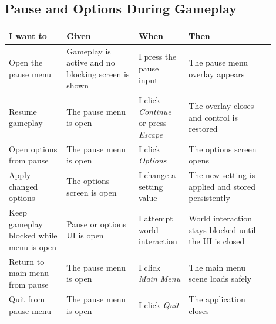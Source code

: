 \subsection*{Pause and Options During Gameplay}
\begin{table}[H]
\centering
\caption{User Stories: Pause and Options During Gameplay}
\label{tab:userstories-pause-options}
\begin{longtable}{|>{\centering\arraybackslash}m{0.20\linewidth}|>{\centering\arraybackslash}m{0.25\linewidth}|>{\centering\arraybackslash}m{0.15\linewidth}|>{\centering\arraybackslash}m{0.30\linewidth}|}
\hline
\hline
\textbf{I want to} & \textbf{Given} & \textbf{When} & \textbf{Then} \\
\hline
Open the pause menu & Gameplay is active and no blocking screen is shown & I press the pause input & The pause menu overlay appears \\
\hline
Resume gameplay & The pause menu is open & I click \textit{Continue} or press \textit{Escape} & The overlay closes and control is restored \\
\hline
Open options from pause & The pause menu is open & I click \textit{Options} & The options screen opens \\
\hline
Apply changed options & The options screen is open & I change a setting value & The new setting is applied and stored persistently \\
\hline
Keep gameplay blocked while menu is open & Pause or options UI is open & I attempt world interaction & World interaction stays blocked until the UI is closed \\
\hline
Return to main menu from pause & The pause menu is open & I click \textit{Main Menu} & The main menu scene loads safely \\
\hline
Quit from pause menu & The pause menu is open & I click \textit{Quit} & The application closes \\
\hline
\end{longtable}
\addtocounter{table}{-1}
\end{table}


